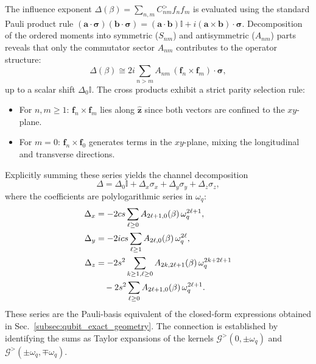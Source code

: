 The influence exponent $\Delta(\beta) = \sum_{n,m} C^>_{nm} f_n f_m$ is evaluated using the standard Pauli product rule $(\mathbf{a}\cdot\boldsymbol{\sigma})(\mathbf{b}\cdot\boldsymbol{\sigma}) = (\mathbf{a}\cdot\mathbf{b})\mathbb{I} + i(\mathbf{a}\times\mathbf{b})\cdot\boldsymbol{\sigma}$. Decomposition of the ordered moments into symmetric ($S_{nm}$) and antisymmetric ($A_{nm}$) parts reveals that only the commutator sector $A_{nm}$ contributes to the operator structure:
\begin{equation}
    \Delta(\beta) \cong 2i\sum_{n>m} A_{nm}\,(\mathbf{f}_n\times\mathbf{f}_m)\cdot\boldsymbol{\sigma},
    \label{eq:Delta_Pauli_Anm_appalg}
\end{equation}
up to a scalar shift $\Delta_0\mathbb{I}$. The cross products exhibit a strict parity selection rule:
\begin{itemize}
    \item For $n,m \ge 1$: $\mathbf{f}_n \times \mathbf{f}_m$ lies along $\hat{\mathbf{z}}$ since both vectors are confined to the $xy$-plane.
    \item For $m=0$: $\mathbf{f}_n \times \mathbf{f}_0$ generates terms in the $xy$-plane, mixing the longitudinal and transverse directions.
\end{itemize}
Explicitly summing these series yields the channel decomposition
\begin{equation}
    \Delta = \Delta_0\mathbb{I} + \Delta_x\sigma_x + \Delta_y\sigma_y + \Delta_z\sigma_z,
    \label{eq:Delta_xyz_form_appalg}
\end{equation}
where the coefficients are polylogarithmic series in $\omega_q$:
\begin{align}
    \Delta_x &= -2cs\sum_{\ell\ge0}A_{2\ell+1,0}(\beta)\,\omega_q^{2\ell+1}, \label{eq:Deltax_series_appalg}\\
    \Delta_y &= -2ics\sum_{\ell\ge1}A_{2\ell,0}(\beta)\,\omega_q^{2\ell}, \label{eq:Deltay_series_appalg}\\
    \Delta_z &= -2s^2\sum_{k\ge1,\ell\ge0}A_{2k,2\ell+1}(\beta)\,\omega_q^{2k+2\ell+1} \notag\\
             &\quad -2s^2\sum_{\ell\ge0}A_{2\ell+1,0}(\beta)\,\omega_q^{2\ell+1}. \label{eq:Deltaz_series_appalg}
\end{align}
These series are the Pauli-basis equivalent of the closed-form expressions obtained in Sec.~\ref{subsec:qubit_exact_geometry}. The connection is established by identifying the sums as Taylor expansions of the kernels $\mathcal{G}^>(0,\pm\omega_q)$ and $\mathcal{G}^>(\pm\omega_q,\mp\omega_q)$.

